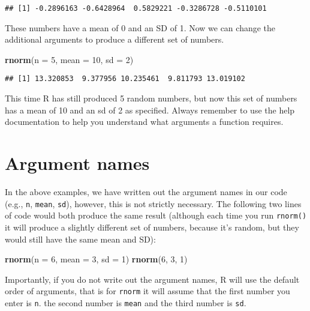 \documentclass[
]{book}
\newenvironment{Shaded}{\begin{snugshade}}{\end{snugshade}}
\newcommand{\AttributeTok}[1]{\textcolor[rgb]{0.13,0.29,0.53}{#1}}
\newcommand{\DecValTok}[1]{\textcolor[rgb]{0.00,0.00,0.81}{#1}}
\newcommand{\FunctionTok}[1]{\textcolor[rgb]{0.13,0.29,0.53}{\textbf{#1}}}
\newcommand{\NormalTok}[1]{#1}
\begin{document}
\begin{verbatim}
## [1] -0.2896163 -0.6428964  0.5829221 -0.3286728 -0.5110101
\end{verbatim}

These numbers have a mean of 0 and an SD of 1. Now we can change the additional arguments to produce a different set of numbers.

\begin{Shaded}
\begin{Highlighting}[]
\FunctionTok{rnorm}\NormalTok{(}\AttributeTok{n =} \DecValTok{5}\NormalTok{, }\AttributeTok{mean =} \DecValTok{10}\NormalTok{, }\AttributeTok{sd =} \DecValTok{2}\NormalTok{)}
\end{Highlighting}
\end{Shaded}

\begin{verbatim}
## [1] 13.320853  9.377956 10.235461  9.811793 13.019102
\end{verbatim}

This time R has still produced 5 random numbers, but now this set of numbers has a mean of 10 and an sd of 2 as specified. Always remember to use the help documentation to help you understand what arguments a function requires.

\section{Argument names}\label{argument-names}

In the above examples, we have written out the argument names in our code (e.g., \texttt{n}, \texttt{mean}, \texttt{sd}), however, this is not strictly necessary. The following two lines of code would both produce the same result (although each time you run \texttt{rnorm()} it will produce a slightly different set of numbers, because it's random, but they would still have the same mean and SD):

\begin{Shaded}
\begin{Highlighting}[]
\FunctionTok{rnorm}\NormalTok{(}\AttributeTok{n =} \DecValTok{6}\NormalTok{, }\AttributeTok{mean =} \DecValTok{3}\NormalTok{, }\AttributeTok{sd =} \DecValTok{1}\NormalTok{)}
\FunctionTok{rnorm}\NormalTok{(}\DecValTok{6}\NormalTok{, }\DecValTok{3}\NormalTok{, }\DecValTok{1}\NormalTok{)}
\end{Highlighting}
\end{Shaded}

Importantly, if you do not write out the argument names, R will use the default order of arguments, that is for \texttt{rnorm} it will assume that the first number you enter is \texttt{n}. the second number is \texttt{mean} and the third number is \texttt{sd}.
\end{document}

